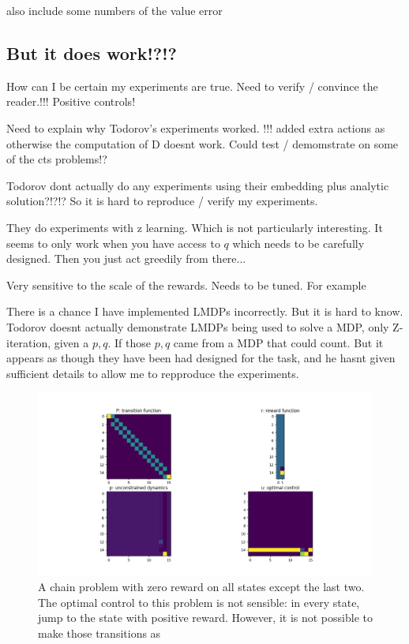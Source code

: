 {\color{red}also include some numbers of the value error}

\subsection{But it does work!?!?}

How can I be certain my experiments are true. Need to verify / convince the reader.!!!
Positive controls!

Need to explain why Todorov's experiments worked. !!!
added extra actions as otherwise the computation of D doesnt work.
Could test / demomstrate on some of the cts problems!?

Todorov dont actually do any experiments using their embedding plus analytic solution?!?!? So it is hard to reproduce / verify my experiments.

They do experiments with z learning. Which is not particularly interesting. It seems to only work when you have access to $q$ which needs to be carefully designed. Then you just act greedily from there...

Very sensitive to the scale of the rewards. Needs to be tuned. For example

There is a chance I have implemented LMDPs incorrectly. But it is hard to know.
Todorov doesnt actually demonstrate LMDPs being used to solve a MDP, only Z-iteration, given a $p, q$.
If those $p, q$ came from a MDP that could count. But it appears as though they
have been had designed for the task, and he hasnt given sufficient details to allow me to repproduce the experiments.


\begin{figure}
\centering
\includegraphics[width=1\textwidth,height=0.35\textheight]{../../pictures/figures/chain-test-zero-rewards.png}
\caption{A chain problem with zero reward on all states except the last two.
The optimal control to this problem is not sensible: in every state, jump to the state with positive reward.
However, it is not possible to make those transitions as }
\end{figure}


